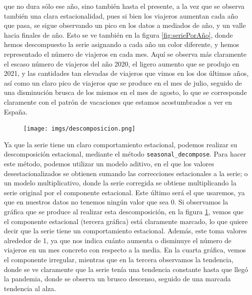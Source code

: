 \documentclass[a4paper,onecolumn]{extarticle}
\begin{document}
\begin{sloppypar}
que no dura sólo ese año, sino también hasta el presente, a la vez que se observa también una clara estacionalidad, pues si bien los viajeros aumentan cada año
que pasa, se sigue observando un pico en los datos a mediados de año, y un valle hacia finales de año. Esto se ve también en la figura \ref{fig:seriePorAño}, 
donde hemos descompuesto la serie asignando a cada año un color diferente, y hemos representado el número de viajeros en cada mes. Aquí se observa más 
claramente el escaso número de viajeros del año 2020, el ligero aumento que se produjo en 2021, y las cantidades tan elevadas de viajeros que vimos en los dos 
últimos años, así como un claro pico de viajeros que se produce en el mes de julio, seguido de una disminución brusca de los mismos en el mes de agosto, lo 
que se corresponde claramente con el patrón de vacaciones que estamos acostumbrados a ver en España.

\begin{center}
    \begin{figure}[h!]
        \centering
        \texttt{[image: imgs/descomposicion.png]}
        \caption{} \label{fig:descomposicion}
    \end{figure}
\end{center}

Ya que la serie tiene un claro comportamiento estacional, podemos realizar su descomposición estacional, mediante el método \texttt{seasonal\_decompose}. Para 
hacer este método, podemos utilizar un modelo aditivo, en el que los valores desestacionalizados se obtienen sumando las correcciones estacionales a la serie;
o un modelo multiplicativo, donde la serie corregida se obtiene multiplicando la serie original por el componente estacional. Este último será el que usaremos, 
ya que en nuestros datos no tenemos ningún valor que sea 0. Si observamos la gráfica que se produce al realizar esta descomposición, en la figura 
\ref{fig:descomposicion}, vemos que el componente estacional (tercera gráfica) está claramente marcado, lo que quiere decir que la serie tiene un comportamiento 
estacional. Además, este toma valores alrededor de 1, ya que nos indica cuánto aumenta o disminuye el número de viajeros en un mes concreto con respecto a la 
media. En la cuarta gráfica, vemos el componente irregular, mientras que en la tercera observamos la tendencia, donde se ve claramente que la serie tenía una 
tendencia constante hasta que llegó la pandemia, donde se observa un brusco descenso, seguido de una marcada tendencia al alza.


\end{sloppypar}
\end{document}
